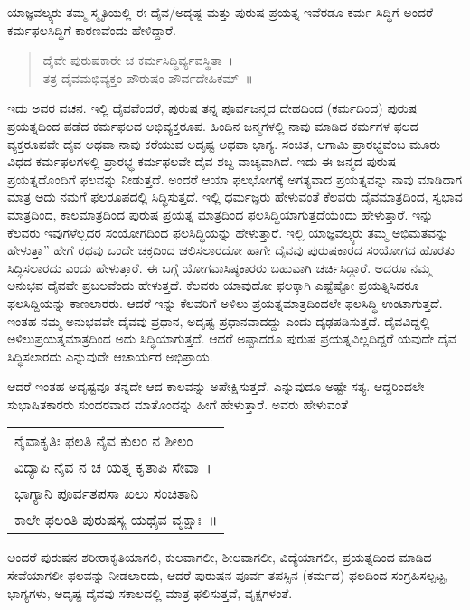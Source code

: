 {ಯಾಜ್ಞವಲ್ಕ್ಯರು ತಮ್ಮ ಸ್ಮೃತಿಯಲ್ಲಿ ಈ ದೈವ/ಅದೃಷ್ಟ ಮತ್ತು ಪುರುಷ ಪ್ರಯತ್ನ ಇವೆರಡೂ ಕರ್ಮ ಸಿದ್ಧಿಗೆ ಅಂದರೆ ಕರ್ಮಫಲಸಿದ್ಧಿಗೆ ಕಾರಣವೆಂದು ಹೇಳಿದ್ದಾರೆ.
\begin{verse}
ದೈವೇ ಪುರುಷಕಾರೇ ಚ ಕರ್ಮಸಿದ್ಧಿರ್ವ್ಯವಸ್ಥಿತಾ~।\\
ತತ್ರ ದೈವಮಭಿವ್ಯಕ್ತಂ ಪೌರುಷಂ ಪೌರ್ವದೇಹಿಕಮ್~॥
\end{verse}
ಇದು ಅವರ ವಚನ. ಇಲ್ಲಿ ದೈವವೆಂದರೆ, ಪುರುಷ ತನ್ನ ಪೂರ್ವಜನ್ಮದ ದೇಹದಿಂದ (ಕರ್ಮದಿಂದ) ಪುರುಷ ಪ್ರಯತ್ನದಿಂದ ಪಡೆದ ಕರ್ಮಫಲದ ಅಭಿವ್ಯಕ್ತರೂಪ. ಹಿಂದಿನ ಜನ್ಮಗಳಲ್ಲಿ ನಾವು ಮಾಡಿದ ಕರ್ಮಗಳ ಫಲದ ವ್ಯಕ್ತರೂಪವೇ ದೈವ ಅಥವಾ ನಾವು ಕರೆಯುವ ಅದೃಷ್ಟ ಅಥವಾ ಭಾಗ್ಯ. ಸಂಚಿತ, ಆಗಾಮಿ ಪ್ರಾರಭ್ಧವೆಂಬ ಮೂರು ವಿಧದ ಕರ್ಮಫಲಗಳಲ್ಲಿ ಪ್ರಾರಭ್ಧ ಕರ್ಮಫಲವೇ ದೈವ ಶಬ್ದ ವಾಚ್ಯವಾಗಿದೆ. ಇದು ಈ ಜನ್ಮದ ಪುರುಷ ಪ್ರಯತ್ನದೊಂದಿಗೆ ಫಲವನ್ನು ನೀಡುತ್ತದೆ. ಅಂದರೆ ಆಯಾ ಫಲಭೋಗಕ್ಕೆ ಅಗತ್ಯ\-ವಾದ ಪ್ರಯತ್ನವನ್ನು ನಾವು ಮಾಡಿದಾಗ ಮಾತ್ರ ಅದು ನಮಗೆ ಫಲರೂಪದಲ್ಲಿ ಸಿದ್ಧಿಸುತ್ತದೆ. ಇಲ್ಲಿ ಧರ್ಮಜ್ಞರು ಹೇಳುವಂತೆ ಕೆಲವರು ದೈವಮಾತ್ರದಿಂದ, ಸ್ವಭಾವ ಮಾತ್ರದಿಂದ, ಕಾಲಮಾತ್ರದಿಂದ ಪುರುಷ ಪ್ರಯತ್ನ ಮಾತ್ರದಿಂದ ಫಲಸಿದ್ಧಿಯಾಗು\-ತ್ತದೆಯೆಂದು ಹೇಳುತ್ತಾರೆ. ಇನ್ನು ಕೆಲವರು ಇವುಗಳೆಲ್ಲದರ ಸಂಯೋಗದಿಂದ ಫಲಸಿದ್ಧಿಯನ್ನು ಹೇಳುತ್ತಾರೆ. ಇಲ್ಲಿ ಯಾಜ್ಞವಲ್ಕ್ಯರು ತಮ್ಮ ಅಭಿಮತವನ್ನು ಹೇಳುತ್ತಾ” ಹೇಗೆ ರಥವು ಒಂದೇ ಚಕ್ರದಿಂದ ಚಲಿಸಲಾರದೋ ಹಾಗೇ ದೈವವು ಪುರುಷಕಾರದ ಸಂಯೋಗದ ಹೊರತು ಸಿದ್ಧಿಸಲಾರದು ಎಂದು ಹೇಳುತ್ತಾರೆ. ಈ ಬಗ್ಗೆ ಯೋಗವಾಸಿಷ್ಠಕಾರರು ಬಹುವಾಗಿ ಚರ್ಚಿಸಿದ್ದಾರೆ. ಅದರೂ ನಮ್ಮ ಅನುಭವ ದೈವವೇ ಪ್ರಬಲವೆಂದು ಹೇಳುತ್ತದೆ. ಕೆಲವರು ಯಾವುದೋ ಫಲಕ್ಕಾಗಿ ಎಷ್ಟೆಷ್ಟೋ ಪ್ರಯತ್ನಿಸಿದರೂ ಫಲಸಿದ್ದಿಯನ್ನು ಕಾಣಲಾರರು. ಆದರೆ ಇನ್ನು ಕೆಲವರಿಗೆ ಅಳಿಲು ಪ್ರಯತ್ನಮಾತ್ರದಿಂದಲೇ ಫಲಸಿದ್ಧಿ ಉಂಟಾಗುತ್ತದೆ. ಇಂತಹ ನಮ್ಮ ಅನುಭವವೇ ದೈವವು ಪ್ರಧಾನ, ಅದೃಷ್ಟ ಪ್ರಧಾನ\-ವಾದದ್ದು ಎಂದು ದೃಢಪಡಿಸುತ್ತದೆ. ದೈವವಿದ್ದಲ್ಲಿ ಅಳಿಲುಪ್ರಯತ್ನಮಾತ್ರದಿಂದ ಅದು ಸಿದ್ಧಿಯಾಗುತ್ತದೆ. ಆದರೆ ಅಷ್ಟಾದರೂ ಪುರುಷ ಪ್ರಯತ್ನವಿಲ್ಲದಿದ್ದರೆ ಯವುದೇ ದೈವ ಸಿದ್ಧಿಸಲಾರದು ಎನ್ನುವುದೇ ಆಚಾರ್ಯರ ಅಭಿಪ್ರಾಯ. 

ಆದರೆ ಇಂತಹ ಅದೃಷ್ಟವೂ ತನ್ನದೇ ಆದ ಕಾಲವನ್ನು ಅಪೇಕ್ಷಿಸುತ್ತದೆ. ಎನ್ನುವುದೂ ಅಷ್ಟೇ ಸತ್ಯ. ಆದ್ದರಿಂದಲೇ ಸುಭಾಷಿತಕಾರರು ಸುಂದರವಾದ ಮಾತೊಂದನ್ನು ಹೀಗೆ ಹೇಳುತ್ತಾರೆ. ಅವರು ಹೇಳುವಂತೆ   \enginline{--}  
\vskip 2pt

\begin{tabular}{>{\hspace{0.8cm}}l}
ನೈವಾಕೃತಿಃ ಫಲತಿ ನೈವ ಕುಲಂ ನ ಶೀಲಂ \\ವಿದ್ಯಾಪಿ ನೈವ ನ ಚ ಯತ್ನ ಕೃತಾಪಿ ಸೇವಾ~।\\
ಭಾಗ್ಯಾನಿ ಪೂರ್ವತಪಸಾ ಖಲು ಸಂಚಿತಾನಿ \\ಕಾಲೇ ಫಲಂತಿ ಪುರುಷಸ್ಯ ಯಥೈವ ವೃಕ್ಷಾಃ~॥
\end{tabular}
\vskip 2pt

\noindent
ಅಂದರೆ ಪುರುಷನ ಶರೀರಾಕೃತಿಯಾಗಲಿ, ಕುಲವಾಗಲೀ, ಶೀಲವಾಗಲೀ, ವಿದ್ಯೆಯಾಗಲೀ, ಪ್ರಯತ್ನದಿಂದ ಮಾಡಿದ ಸೇವೆಯಾಗಲೀ ಫಲವನ್ನು ನೀಡಲಾರದು, ಆದರೆ ಪುರುಷನ ಪೂರ್ವ ತಪಸ್ಸಿನ (ಕರ್ಮದ) ಫಲದಿಂದ ಸಂಗ್ರಹಿಸಲ್ಪಟ್ಟ, ಭಾಗ್ಯಗಳು, ಅದೃಷ್ಟ ದೈವವು ಸಕಾಲದಲ್ಲಿ ಮಾತ್ರ ಫಲಿಸುತ್ತವೆ, ವೃಕ್ಷಗಳಂತೆ. 

}
